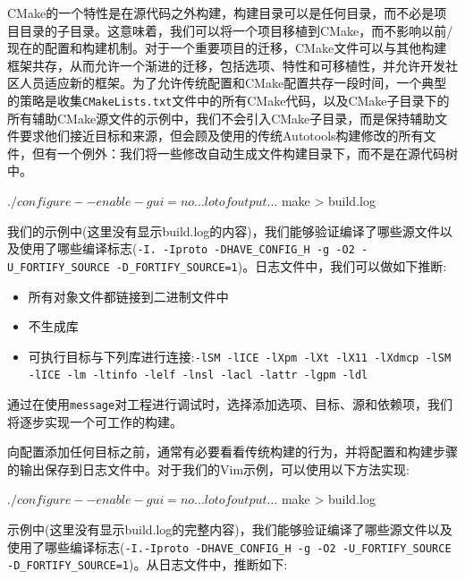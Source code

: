CMake的一个特性是在源代码之外构建，构建目录可以是任何目录，而不必是项目目录的子目录。这意味着，我们可以将一个项目移植到CMake，而不影响以前/现在的配置和构建机制。对于一个重要项目的迁移，CMake文件可以与其他构建框架共存，从而允许一个渐进的迁移，包括选项、特性和可移植性，并允许开发社区人员适应新的框架。为了允许传统配置和CMake配置共存一段时间，一个典型的策略是收集\texttt{CMakeLists.txt}文件中的所有CMake代码，以及CMake子目录下的所有辅助CMake源文件的示例中，我们不会引入CMake子目录，而是保持辅助文件要求他们接近目标和来源，但会顾及使用的传统Autotools构建修改的所有文件，但有一个例外：我们将一些修改自动生成文件构建目录下，而不是在源代码树中。

\begin{codebox}[shell]
$ ./configure --enable-gui=no

... lot of output ...

$ make > build.log
\end{codebox}

我们的示例中(这里没有显示build.log的内容)，我们能够验证编译了哪些源文件以及使用了哪些编译标志(\texttt{-I. -Iproto -DHAVE\_CONFIG\_H -g -O2 -U\_FORTIFY\_SOURCE -D\_FORTIFY\_SOURCE=1})。日志文件中，我们可以做如下推断:

\begin{itemize}
\item 所有对象文件都链接到二进制文件中

\item 不生成库

\item 可执行目标与下列库进行连接:\texttt{-lSM -lICE -lXpm -lXt -lX11 -lXdmcp -lSM -lICE -lm -ltinfo -lelf -lnsl -lacl -lattr -lgpm -ldl}

\end{itemize}

通过在使用\texttt{message}对工程进行调试时，选择添加选项、目标、源和依赖项，我们将逐步实现一个可工作的构建。


向配置添加任何目标之前，通常有必要看看传统构建的行为，并将配置和构建步骤的输出保存到日志文件中。对于我们的Vim示例，可以使用以下方法实现:

\begin{codebox}[shell]
$ ./configure --enable-gui=no

... lot of output ...

$ make > build.log
\end{codebox}

示例中(这里没有显示build.log的完整内容)，我们能够验证编译了哪些源文件以及使用了哪些编译标志(\texttt{-I.-Iproto -DHAVE\_CONFIG\_H -g -O2 -U\_FORTIFY\_SOURCE -D\_FORTIFY\_SOURCE=1})。从日志文件中，推断如下:

